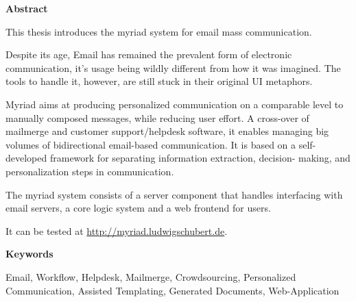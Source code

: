 

\clearemptydoublepage
{}
{}


\vspace*{2cm}
\begin{center}
{\Large \bf Abstract}
\end{center}
\vspace{1cm}

This thesis introduces the myriad system for email mass communication.

Despite its age, Email has remained the prevalent form of electronic communication, it's usage being wildly different from how it was imagined. The tools to handle it, however, are still stuck in their original UI metaphors.

Myriad aims at producing personalized communication on a comparable level to manually composed messages, while reducing user effort.
A cross-over of mailmerge and customer support/helpdesk software, it enables managing big volumes of bidirectional email-based communication.
It is based on a self-developed framework for separating information extraction, decision- making, and personalization steps in communication.

The myriad system consists of a server component that handles interfacing with email servers, a core logic system and a web frontend for users.

It can be tested at \url{http://myriad.ludwigschubert.de}.

\vspace*{2cm}
\begin{center}
{\Large \bf Keywords}
\end{center}
\vspace{1cm}

Email, Workflow, Helpdesk, Mailmerge, Crowdsourcing, Personalized Communication, Assisted Templating, Generated Documents, Web-Application